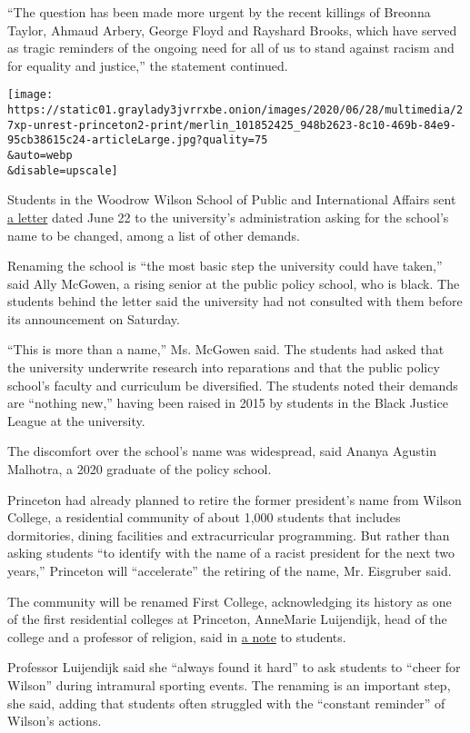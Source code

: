 ``The question has been made more urgent by the recent killings of
Breonna Taylor, Ahmaud Arbery, George Floyd and Rayshard Brooks, which
have served as tragic reminders of the ongoing need for all of us to
stand against racism and for equality and justice,'' the statement
continued.

\texttt{[image: https://static01.graylady3jvrrxbe.onion/images/2020/06/28/multimedia/27xp-unrest-princeton2-print/merlin\_101852425\_948b2623-8c10-469b-84e9-95cb38615c24-articleLarge.jpg?quality=75\\\&auto=webp\\\&disable=upscale]}

Students in the Woodrow Wilson School of Public and International
Affairs sent
\href{https://drive.google.com/file/d/1lpxEuLY_5rV4VTwC1Ly8sa2r77XuMVEE/view}{a
letter} dated June 22 to the university's administration asking for the
school's name to be changed, among a list of other demands.

Renaming the school is ``the most basic step the university could have
taken,'' said Ally McGowen, a rising senior at the public policy school,
who is black. The students behind the letter said the university had not
consulted with them before its announcement on Saturday.

``This is more than a name,'' Ms. McGowen said. The students had asked
that the university underwrite research into reparations and that the
public policy school's faculty and curriculum be diversified. The
students noted their demands are ``nothing new,'' having been raised in
2015 by students in the Black Justice League at the university.

The discomfort over the school's name was widespread, said Ananya
Agustin Malhotra, a 2020 graduate of the policy school.

Princeton had already planned to retire the former president's name from
Wilson College, a residential community of about 1,000 students that
includes dormitories, dining facilities and extracurricular programming.
But rather than asking students ``to identify with the name of a racist
president for the next two years,'' Princeton will ``accelerate'' the
retiring of the name, Mr. Eisgruber said.

The community will be renamed First College, acknowledging its history
as one of the first residential colleges at Princeton, AnneMarie
Luijendijk, head of the college and a professor of religion, said in
\href{https://wilsoncollege.princeton.edu/news/we-are-now-first-college}{a
note} to students.

Professor Luijendijk said she ``always found it hard'' to ask students
to ``cheer for Wilson'' during intramural sporting events. The renaming
is an important step, she said, adding that students often struggled
with the ``constant reminder'' of Wilson's actions.

